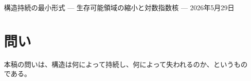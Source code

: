 \documentclass[12pt,a4paper]{article}
\begin{document}
\PaperTitleBlock
  {構造持続の最小形式}
  {— 生存可能領域の縮小と対数指数核 —}
  {2026年5月29日}

\begin{abstract}
構造が失われるのは、資源が尽きるときだけではない。資源がなお残っていても、制約の蓄積によって、その構造を維持できる状態の領域が縮小し、ついにはその構造として保てる状態が残らなくなることがある。本稿は、この事実を表す最小形式を与える。ここでいう最小形式とは、自明な前提ではなく、構造喪失を生存可能領域の縮小として測るための第一の非自明な形式核である。

事前固定された構造維持問題において、何として持続するかを表す維持対象 \(F\)、それを担う構造 \(K\)、および \(K\) が \(F\) を担える生存可能領域 \(V_K\) を固定する。その逐次縮小を考えると、段階損失に対する自然な公理系、すなわち比率依存性、正規化、加法性、連続性のもとで、段階損失の関数形は対数比として一意に定まる。そのうえで、累積段階損失量の望遠鏡積として

\[
m(V_{n}) = m(V_0) e^{-L_{n}}
\]

が恒等的に成り立つ。したがって指数核は、追加の経験的仮定ではなく、公理系と測度比の乗法性から導かれる形式である。

本稿の意義は、構造の喪失を資源枯渇だけではなく、生存可能領域の縮小として定式化し、その自然な尺度が対数比に強制されることを示す点にある。したがって、本稿の主張は望遠鏡積そのものが珍しいということではない。非自明なのは、何を生存可能領域として固定し、どの測度でその縮小を読むかを事前に定め、その座標のもとで指数核を経験法則ではなく表現形式として切り出す点である。

最後に、名目的・素材的資源 \(R\) と、その時点で実際に \(K\) に効く有効資源 \(M\) を分ける。\(M\) をリソース側のスカラーとして別途導入し、構造持続ポテンシャルを

\[
S = M e^{-L}
\]

と定義する。ここで \(M\) は指数核そのものから導かれる量ではなく、対象となる構造条件を維持するためにその時点で使える有効資源を外側に明示するための項である。したがって \(S\) は完全持続ポテンシャルの読み出しであり、任意の標的回復可能性そのものではない。標的回復には、別途、標的、修復作用、到達証拠、必要コスト境界が必要である。
\end{abstract}

\section{問い}\label{ux554fux3044}

本稿の問いは、構造は何によって持続し、何によって失われるのか、というものである。
\end{document}

